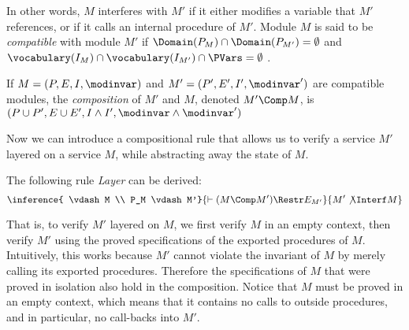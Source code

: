 In other words, $M$ interferes with $M'$ if it either
modifies a variable that $M'$ references, or if it calls an internal
procedure of $M'$.
Module $M$ is said to be \emph{compatible} with module $M'$ if $\Domain(P_M) \cap \Domain(P_{M'}) = \emptyset$ and $\vocabulary(I_M) \cap \vocabulary(I_{M'}) \cap \PVars = \emptyset$ .

\begin{definition}
  If $M = (P,E,I,\modinvar)$ and $M' = (P',E',I',\modinvar')$ are compatible modules, the \emph{composition} of $M'$ and $M$,
  denoted $M' \Comp M$, is $(P\cup P', E \cup E' , I \wedge I',\modinvar\wedge\modinvar')$
\end{definition}




Now we can introduce a compositional rule that allows us to verify a service
$M'$ layered on a service $M$, while abstracting away the state of $M$.

\begin{theorem}
The following rule \emph{Layer} can be derived:
\[\inference{ \vdash M  \\
              P_M \vdash M'}
            { \vdash (M \Comp M') \Restr E_{M'} } {M' \not \Interf M} \]
\end{theorem}

That is, to verify $M'$ layered on $M$, we first verify $M$ in an
empty context, then verify $M'$ using the proved specifications of the
exported procedures of $M$. Intuitively, this works because $M'$
cannot violate the invariant of $M$ by merely calling its exported
procedures. Therefore the specifications of $M$ that were proved in
isolation also hold in the composition. Notice that $M$ must be proved
in an empty context, which means that it contains no calls to outside
procedures, and in particular, no call-backs into $M'$. 

